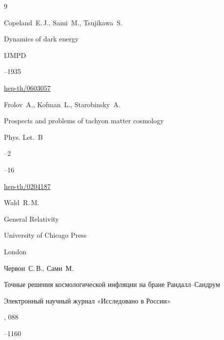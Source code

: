 


\begin{thebibliography}{9}


\by Copeland~E.\,J., Sami~M., Tsujikawa~S.

\paper Dynamics of dark energy

\jour IJMPD




--1935


\arxiv \href{http://arxiv.org/abs/hep-th/0603057}{hep-th/0603057}






\by Frolov~A., Kofman~L., Starobinsky~A.

\paper Prospects and problems of tachyon matter cosmology

\jour Phys. Let.~B


--2


--16

\arxiv \href{http://arxiv.org/abs/hep-th/0204187}{hep-th/0204187}




\by Wald~R.\,M.

\book General Relativity

\publ University of Chicago Press

\publaddr London






\by Червон~С.\,В., Сами~М.

\paper Точные решения космологической инфляции на бране Рандалл--Сандрум

\jour Электронный научный журнал «Исследовано в России»

% 


, 088

--1160 


\end{thebibliography}
